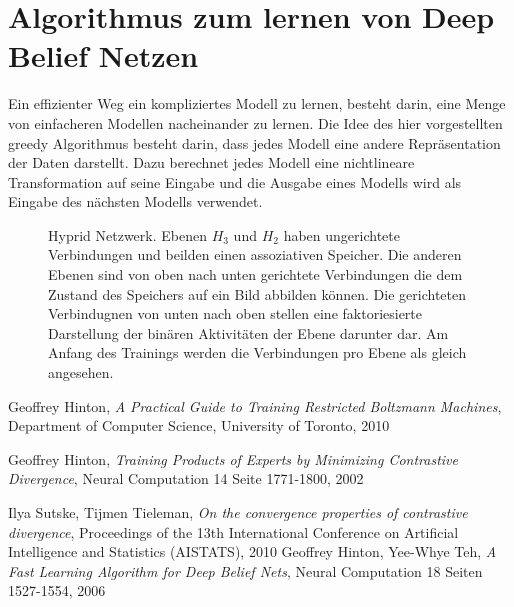 \documentclass[12pt]{article}
\begin{document}
\section{Algorithmus zum lernen von Deep Belief Netzen}
Ein effizienter Weg ein kompliziertes Modell zu lernen, besteht darin, eine Menge von einfacheren Modellen nacheinander zu lernen. Die Idee des hier vorgestellten greedy Algorithmus besteht darin, dass jedes Modell eine andere Repräsentation der Daten darstellt. Dazu berechnet jedes Modell eine nichtlineare Transformation auf seine Eingabe und die Ausgabe eines Modells wird als Eingabe des nächsten Modells verwendet. 

\begin{figure}[H]
	\center
	
	\caption{Hyprid Netzwerk. Ebenen $H_3$ und $H_2$ haben ungerichtete Verbindungen und beilden einen assoziativen Speicher. Die anderen Ebenen sind von oben nach unten gerichtete Verbindungen die dem Zustand des Speichers auf ein Bild abbilden können. Die gerichteten Verbindugnen von unten nach oben stellen eine faktoriesierte Darstellung der binären Aktivitäten der Ebene darunter dar. Am Anfang des Trainings werden die Verbindungen pro Ebene als gleich angesehen.}
\end{figure}

\begin{thebibliography}{9}

Geoffrey Hinton,
\emph{A Practical Guide to Training Restricted Boltzmann Machines},
Department of Computer Science, 
University of Toronto,
2010

Geoffrey Hinton,
\emph{Training Products of Experts by Minimizing Contrastive Divergence},
Neural Computation 14 Seite 1771-1800,
2002

Ilya Sutske, Tijmen Tieleman,
\emph{On the convergence properties of contrastive divergence},
Proceedings of the 13th International Conference on Artificial Intelligence and Statistics (AISTATS),
2010 
Geoffrey Hinton, Yee-Whye Teh,
\emph{A Fast Learning Algorithm for Deep Belief Nets},
Neural Computation 18 Seiten 1527-1554,
2006

\end{thebibliography}
\end{document}
